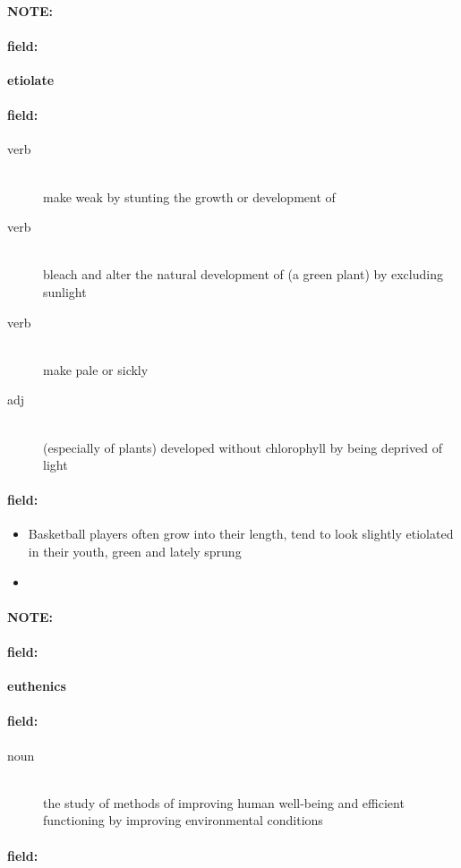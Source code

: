 \documentclass[12pt]{article}
\newenvironment{note}{\paragraph{NOTE:}}{}
\newenvironment{field}{\paragraph{field:}}{}
\begin{document}
\begin{note}
\begin{field}
\textbf{\large etiolate}
\end{field}


\begin{field}
\begin{description}
\item[verb] \hfill \\ 
make weak by stunting the growth or development of

\item[verb] \hfill \\ 
bleach and alter the natural development of (a green plant) by excluding sunlight

\item[verb] \hfill \\ 
make pale or sickly

\item[adj] \hfill \\ 
(especially of plants) developed without chlorophyll by being deprived of light

\end{description}
\end{field}

\begin{field}
\begin{itemize}
\item Basketball players often grow into their length, tend to look slightly etiolated in their youth, green and lately sprung
\item 
\end{itemize}
\end{field}
\end{note}
\begin{note}
\begin{field}
\textbf{\large euthenics}
\end{field}


\begin{field}
\begin{description}
\item[noun] \hfill \\ 
the study of methods of improving human well-being and efficient functioning by improving environmental conditions

\end{description}
\end{field}

\begin{field}
\end{field}
\end{note}
\end{document}
